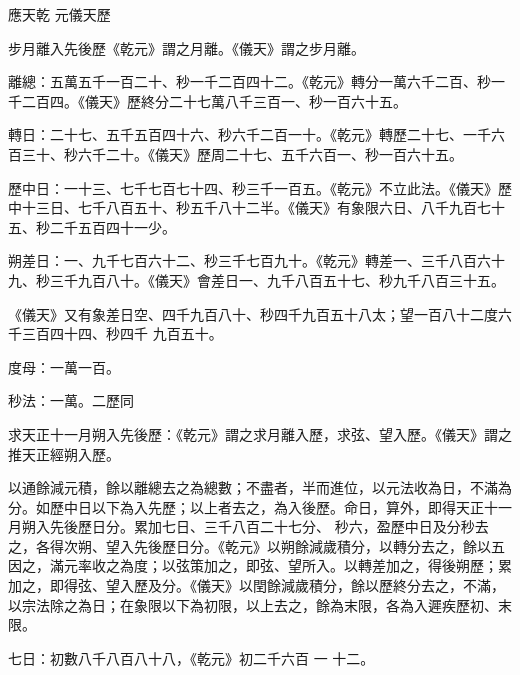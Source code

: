 
\begin{pinyinscope}

 應天乾
 元儀天歷



 步月離入先後歷《乾元》謂之月離。《儀天》謂之步月離。



 離總：五萬五千一百二十、秒一千二百四十二。《乾元》轉分一萬六千二百、秒一千二百四。《儀天》歷終分二十七萬八千三百一、秒一百六十五。



 轉日：二十七、五千五百四十六、秒六千二百一十。《乾元》轉歷二十七、一千六百三十、秒六千二十。《儀天》歷周二十七、五千六百一、秒一百六十五。



 歷中日：一十三、七千七百七十四、秒三千一百五。《乾元》不立此法。《儀天》歷中十三日、七千八百五十、秒五千八十二半。《儀天》有象限六日、八千九百七十五、秒二千五百四十一少。



 朔差日：一、九千七百六十二、秒三千七百九十。《乾元》轉差一、三千八百六十九、秒三千九百八十。《儀天》會差日一、九千八百五十七、秒九千八百三十五。



 《儀天》又有象差日空、四千九百八十、秒四千九百五十八太；望一百八十二度六千三百四十四、秒四千
 九百五十。



 度母：一萬一百。



 秒法：一萬。二歷同



 求天正十一月朔入先後歷：《乾元》謂之求月離入歷，求弦、望入歷。《儀天》謂之推天正經朔入歷。



 以通餘減元積，餘以離總去之為總數；不盡者，半而進位，以元法收為日，不滿為分。如歷中日以下為入先歷；以上者去之，為入後歷。命日，算外，即得天正十一月朔入先後歷日分。累加七日、三千八百二十七分、
 秒六，盈歷中日及分秒去之，各得次朔、望入先後歷日分。《乾元》以朔餘減歲積分，以轉分去之，餘以五因之，滿元率收之為度；以弦策加之，即弦、望所入。以轉差加之，得後朔歷；累加之，即得弦、望入歷及分。《儀天》以閏餘減歲積分，餘以歷終分去之，不滿，以宗法除之為日；在象限以下為初限，以上去之，餘為末限，各為入遲疾歷初、末限。



 七日：初數八千八百八十八，《乾元》初二千六百
 一
 十二。




\end{pinyinscope}

